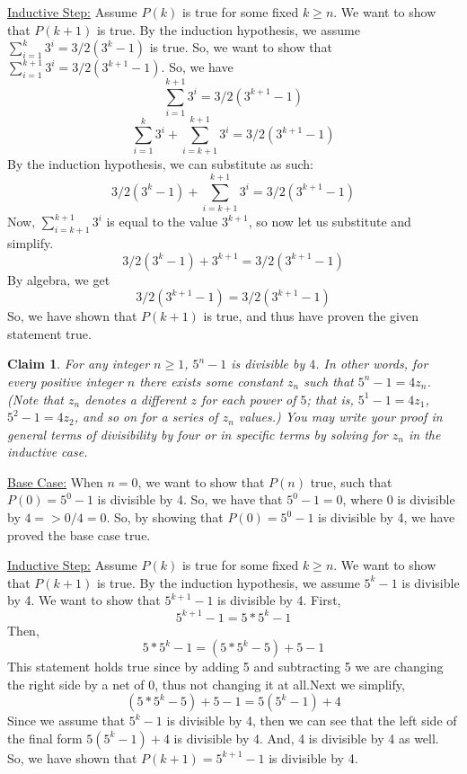\documentclass{article}
\newtheorem{claim}{Claim}
\begin{document}
    \noindent \underline{Inductive Step:} \newline
    Assume $P(k)$ is true for some fixed $k \geq n$. 
    We want to show that $P(k+1)$ is true. By the induction hypothesis, 
    we assume $\sum_{i=1}^{k} 3^i = {3/2}(3^k - 1)$ is true. So, we want to show
    that $\sum_{i=1}^{k+1} 3^i = {3/2}(3^{k+1} - 1)$. So, we have
    $$\sum_{i=1}^{k+1} 3^i = {3/2}(3^{k+1} - 1)$$
    $$\sum_{i=1}^{k} 3^i + \sum_{i=k+1}^{k+1} 3^i = {3/2}(3^{k+1} - 1)$$
    By the induction hypothesis, we can substitute as such:
    $${3/2}(3^k - 1) + \sum_{i=k+1}^{k+1} 3^i = {3/2}(3^{k+1} - 1)$$
    Now, $\sum_{i=k+1}^{k+1} 3^i$ is equal to the value $3^{k+1}$, so 
    now let us substitute and simplify.
    $${3/2}(3^k - 1) + 3^{k+1} = {3/2}(3^{k+1} - 1)$$
    By algebra, we get
    $${3/2}(3^{k+1} - 1)= {3/2}(3^{k+1} - 1)$$
    So, we have shown that $P(k+1)$ is true, and thus have proven the given 
    statement true. 

    \begin{claim}
      For any integer $n\geq1$, $5^n-1$ is divisible by $4$.  In other words, for every positive integer $n$ there exists some constant $z_n$ such that $5^n - 1 = 4z_n$.  (Note that $z_n$ denotes a different $z$ for each power of $5$; that is, $5^1 - 1 = 4z_1$, $5^2 - 1 = 4z_2$, and so on for a series of $z_n$ values.)  You may write your proof in general terms of divisibility by four or in specific terms by solving for $z_n$ in the inductive case.
    \end{claim}

    \noindent \underline{Base Case:} \newline
    When $n=0$, we want to show that $P(n)$ true, such 
    that $P(0) = 5^0 - 1$ is divisible by 4. 
    So, we have that $5^0 - 1 = 0$, where 0 is divisible by $4 => 0/4 = 0$. 
    So, by showing that $P(0) = 5^0 - 1$ is divisible by 4, 
    we have proved the base case true. 
    \newline

    \noindent \underline{Inductive Step:} \newline
    Assume $P(k)$ is true for some fixed $k \geq n$. 
    We want to show that $P(k+1)$ is true.
    By the induction hypothesis, we assume $5^k - 1$ is divisible by 4. 
    We want to show that $5^{k+1} -1$ is divisible by 4. \newline
    First, 
    $$5^{k+1} -1 = 5 * 5^k - 1$$ 
    Then, 
    $$5 * 5^k - 1 = (5 * 5^k - 5) +5 - 1$$
    This statement holds true since by adding 5 and subtracting 5 
    we are changing the right side by a net of 0, 
    thus not changing it at all.\newline Next we simplify, 
    $$(5 * 5^k - 5) +5 - 1 = 5(5^k - 1) + 4$$
    Since we assume that $5^k - 1$ is divisible by 4, then we can 
    see that the left side of the final form $5(5^k - 1) + 4$ is 
    divisible by 4. And, 4 is divisible by 4 as well. So, we have 
    shown that $P(k+1) = 5^{k+1} - 1$ is divisible by 4. 
\end{document}
